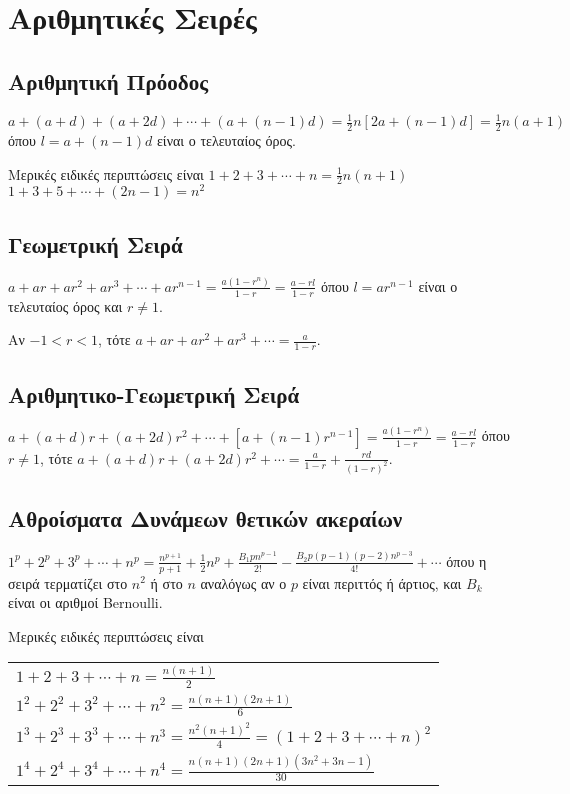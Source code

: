 





\section{Αριθμητικές Σειρές}

\subsection{Αριθμητική Πρόοδος}

$ a + (a+d) + (a+2d) + \cdots + (a+(n-1)d) = \frac{1}{2} n[2a + (n-1)d] =
\frac{1}{2} n(a+1) $ 
όπου $l = a + (n-1)d$ είναι ο τελευταίος όρος.

Μερικές ειδικές περιπτώσεις είναι
$ 1 + 2 + 3 + \cdots + n = \frac{1}{2} n(n+1) $ 
$ 1 + 3 + 5 + \cdots + (2n-1) = n^{2} $ 

\subsection{Γεωμετρική Σειρά}

$ a + ar + ar^{2} + ar^{3} + \cdots + ar^{n-1} = \frac{a(1-r^{n})}{1-r} =
\frac{a-rl}{1-r}$
όπου $ l=ar^{n-1} $ είναι ο τελευταίος όρος και $ r\neq 1 $. 

Αν $ -1<r<1 $, τότε $ a + ar + ar^{2} + ar^{3} + \cdots = \frac{a}{1-r}
$. 

\subsection{Αριθμητικο-Γεωμετρική Σειρά}
$ a + (a+d)r + (a+2d)r^{2} + \cdots + [a+(n-1)r^{n-1}] = \frac{a(1-r^{n})}{1-r}
= \frac{a-rl}{1-r} $ 
όπου $ r\neq 1 $, τότε
$ a + (a+d)r + (a+2d)r^{2} + \cdots = \frac{a}{1-r} + \frac{rd}{(1-r)^{2}}$. 

\subsection{Αθροίσματα Δυνάμεων θετικών ακεραίων}
$ 1^{p} + 2^{p} + 3^{p} + \cdots + n^{p} = \frac{n^{p+1}}{p+1} +
\frac{1}{2} n^{p} + \frac{B_{1} p n^{p-1}}{2!} - \frac{B_{2}
p(p-1)(p-2)n^{p-3}}{4!} + \cdots $
όπου η σειρά τερματίζει στο $ n^{2} $ ή στο $ n $ αναλόγως αν ο $ p $ είναι
περιττός ή άρτιος, και $ B_{k} $ είναι οι αριθμοί \textlatin{Bernoulli}.

Μερικές ειδικές περιπτώσεις είναι
\begin{tabular}{l}
    $1 + 2 + 3 + \cdots + n = \frac{n(n+1)}{2} $ \\ 
    $1^{2} + 2^{2} + 3^{2} + \cdots + n^{2} = \frac{n(n+1)(2n+1)}{6} $ \\
    $1^{3} + 2^{3} + 3^{3} + \cdots + n^{3} = \frac{n^{2}(n+1)^{2}}{4} =
    (1+2+3+\cdots + n)^{2}$ \\
    $ 1^{4} + 2^{4} + 3^{4} + \cdots + n^{4} =
    \frac{n(n+1)(2n+1)(3n^{2}+3n-1)}{30}$ \\
\end{tabular} 

